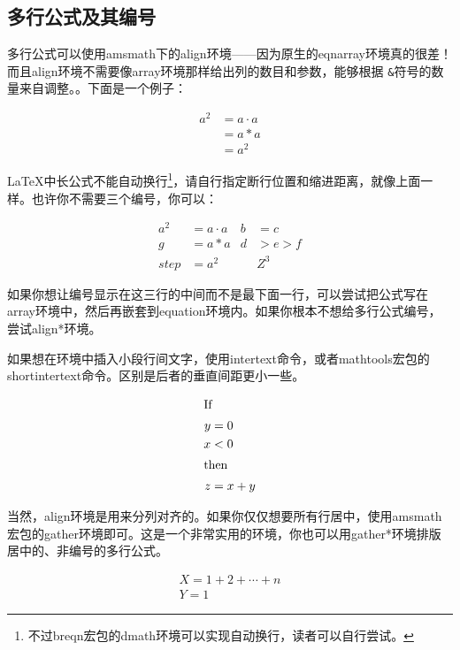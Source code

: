 {\subsection{多行公式及其编号}
\label{subsec:multieqnum}
多行公式可以使用amsmath下的align环境——因为原生的eqnarray环境真的很差！而且align环境不需要像array环境那样给出列的数目和参数，能够根据
\texttt{\&}符号的数量来自调整。。下面是一个例子：

\begin{codeshow}
\begin{align}
  a^2  &= a\cdot a \\
       &= a*a      \\
       &= a^2
\end{align}
\end{codeshow}

\LaTeX 中长公式不能自动换行\footnote{不过breqn宏包的dmath环境可以实现自动换行，读者可以自行尝试。}，请自行指定断行位置和缩进距离，就像上面一样。也许你不需要三个编号，你可以：

\begin{codeshow}
\begin{align}
  a^2&= a\cdot a& b&=c\nonumber\\
  g  &= a*a & d&>e>f  \nonumber\\
  step&= a^2 & &Z^3
\end{align}
\end{codeshow}

如果你想让编号显示在这三行的中间而不是最下面一行，可以尝试把公式写在array环境中，然后再嵌套到equation环境内。如果你根本不想给多行公式编号，尝试align*环境。

如果想在环境中插入小段行间文字，使用intertext命令，或者mathtools宏包的shortintertext命令。区别是后者的垂直间距更小一些。

\begin{codeshow}
\begin{align*}
\shortintertext{If}
 y &= 0 \\
 x &< 0\\
\shortintertext{then}
 z &= x+y
\end{align*}
\end{codeshow}

当然，align环境是用来分列对齐的。如果你仅仅想要所有行居中，使用amsmath宏包的gather环境即可。这是一个非常实用的环境，你也可以用gather*环境排版居中的、非编号的多行公式。

\begin{codeshow}
\begin{gather}
  X=1+2+\cdots+n \\
  Y=1
\end{gather}
\end{codeshow}

}
